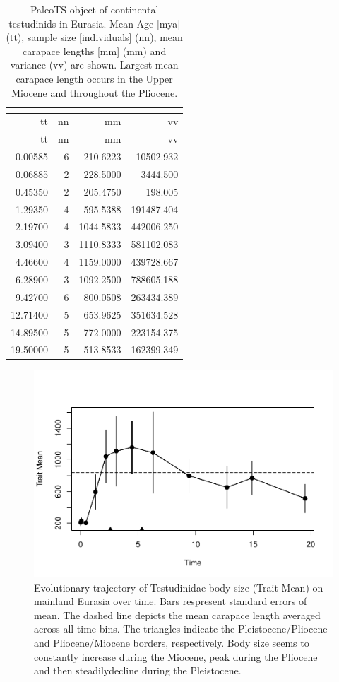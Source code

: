 \begin{longtable}[]{@{}rrrr@{}}
	\caption[PaleoTS object of continental \T in Eurasia]{PaleoTS object of continental testudinids in Eurasia. Mean Age [mya] (tt), sample size [individuals] (nn), mean carapace lengths [mm] (mm) and variance (vv) are shown. Largest mean carapace length occurs in the Upper Miocene and throughout the Pliocene.}
	\label{tab:pTSEurC}
	\tabularnewline
	\toprule
	tt & nn & mm & vv\tabularnewline
	\midrule
	\endfirsthead
	\toprule
	tt & nn & mm & vv\tabularnewline
	\midrule
	\endhead
	0.00585 & 6 & 210.6223 & 10502.932\tabularnewline
	0.06885 & 2 & 228.5000 & 3444.500\tabularnewline
	0.45350 & 2 & 205.4750 & 198.005\tabularnewline
	1.29350 & 4 & 595.5388 & 191487.404\tabularnewline
	2.19700 & 4 & 1044.5833 & 442006.250\tabularnewline
	3.09400 & 3 & 1110.8333 & 581102.083\tabularnewline
	4.46600 & 4 & 1159.0000 & 439728.667\tabularnewline
	6.28900 & 3 & 1092.2500 & 788605.188\tabularnewline
	9.42700 & 6 & 800.0508 & 263434.389\tabularnewline
	12.71400 & 5 & 653.9625 & 351634.528\tabularnewline
	14.89500 & 5 & 772.0000 & 223154.375\tabularnewline
	19.50000 & 5 & 513.8533 & 162399.349\tabularnewline
	\bottomrule
\end{longtable}

\begin{figure}[H]
	\centering
	\includegraphics{MA_JJ_files/figure-latex/pTSEsC-1.pdf}
	\caption[PaleoTS plot of continental \T in Eurasia]{Evolutionary trajectory of Testudinidae body size (Trait Mean) on mainland Eurasia over time. Bars respresent standard errors of mean. The dashed line depicts the mean carapace length averaged across all time bins. The triangles indicate the Pleistocene/Pliocene and Pliocene/Miocene borders, respectively. Body size seems to constantly increase during the Miocene, peak during the Pliocene and then steadilydecline during the Pleistocene.}
	\label{fig:pTSEsC}
\end{figure}

